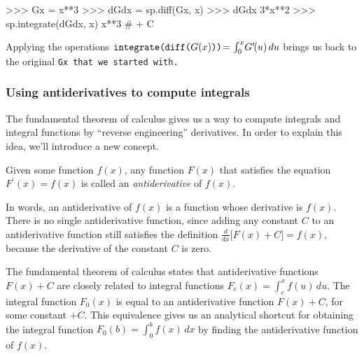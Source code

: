 		\begin{codeblock}[]
		>>> Gx = x**3
		>>> dGdx = sp.diff(Gx, x)
		>>> dGdx
		3*x**2
		>>> sp.integrate(dGdx, x)
		x**3    # + C
		\end{codeblock}

		\noindent
		Applying the operations $\tt{integrate(diff(}G(x)\tt{))}\!=\int_0^x\!G^{\prime\!}(u)\,du$
		brings us back to the original \tt{Gx} that we started with.


		\subsubsection{Using antiderivatives to compute integrals}

			The fundamental theorem of calculus
			gives us a way to compute integrals and integral functions
			by ``reverse engineering'' derivatives.
			In order to explain this idea,
			we'll introduce a new concept.
			
			\vspace{-2mm}
			\begin{shadebox}
				\vspace{1mm}
				Given some function $f(x)$,
				any function $F(x)$ that satisfies the equation $F^{\prime\!}(x) = f(x)$
				is called an \emph{antiderivative} of $f(x)$.
				\vspace{1mm}
			\end{shadebox}
			\vspace{-2mm}
			
			\noindent
			In words,
			an antiderivative of $f(x)$ is a function whose derivative is $f(x)$.
			There is no single antiderivative function,
			since adding any constant $C$ to an antiderivative function
			still satisfies the definition $\frac{d}{dx}\big[ F(x) + C \big] = f(x)$,
			because the derivative of the constant $C$ is zero.

			The fundamental theorem of calculus
			states that antiderivative functions $F(x)+C$
			are closely related to integral functions $F_c(x) = \int_c^x f(u)\,du$.
			The integral function $F_0(x)$ is equal to an antiderivative function $F(x) + C$,
			for some constant $+C$.
			This equivalence gives us an analytical shortcut
			for obtaining the integral function $F_0(b) = \int_0^b f(x)\,dx$
			by finding the antiderivative function of $f(x)$.

